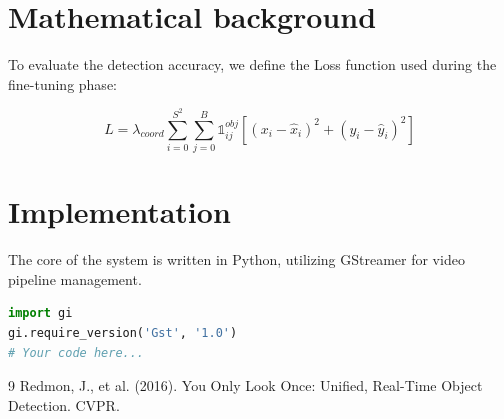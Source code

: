 \documentclass[12pt,a4paper,oneside]{scrreprt}
\begin{document}
\chapter{Mathematical background}
To evaluate the detection accuracy, we define the Loss function used during the fine-tuning phase:

\begin{equation}
L = \lambda_{coord} \sum_{i=0}^{S^2} \sum_{j=0}^{B} \mathds{1}_{ij}^{obj} \left[ (x_i - \hat{x}_i)^2 + (y_i - \hat{y}_i)^2 \right]
\end{equation}

\chapter{Implementation}
The core of the system is written in Python, utilizing GStreamer for video pipeline management.
\begin{lstlisting}[language=Python, caption=GStreamer Pipeline Setup]
import gi
gi.require_version('Gst', '1.0')
# Your code here...
\end{lstlisting}

\begin{thebibliography}{9}
Redmon, J., et al. (2016). You Only Look Once: Unified, Real-Time Object Detection. CVPR.
\end{thebibliography}
\end{document}
